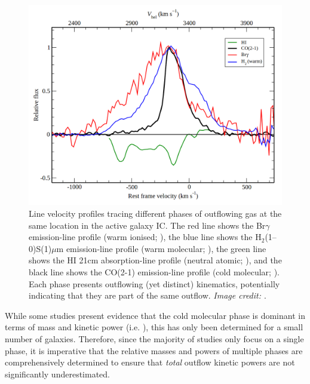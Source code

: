 \begin{figure}[!t]
    \centering
    \includegraphics[width=\linewidth]{figures/introduction/morganti2015_ic5063_multiphase.png}
    \caption[Lines arising from different outflow phases in IC \citep{Morganti2015}, indicating a co-spatial, co-kinematic multi-phase outflow.]{Line velocity profiles tracing different phases of outflowing gas at the same location in the active galaxy IC. The red line shows the Br$\gamma$ emission-line profile (warm ionised; \citealt{Tadhunter2014}), the blue line shows the H$_2$(1--0)S(1)\;$\mu$m emission-line profile (warm molecular; \citealt{Tadhunter2014}), the green line shows the HI 21\;cm absorption-line profile (neutral atomic; \citealt{Morganti1998}), and the black line shows the CO(2-1) emission-line profile (cold molecular; \citealt{Morganti2015}). Each phase presents outflowing (yet distinct) kinematics, potentially indicating that they are part of the same outflow. \textit{Image credit: \citealt{Morganti2015}}.}
    \label{fig: introduction: outflows: energetics: multi-phase: morganti2015_ic5063_multiphase}
\end{figure}

While some studies present evidence that the cold molecular phase is dominant in terms of mass and kinetic power (i.e. \citealt{Morganti2005, Cicone2014, GarciaBurillo2014}), this has only been determined for a small number of galaxies. Therefore, since the majority of studies only focus on a single phase, it is imperative that the relative masses and powers of multiple phases are comprehensively determined to ensure that \textit{total} outflow kinetic powers are not significantly underestimated.

